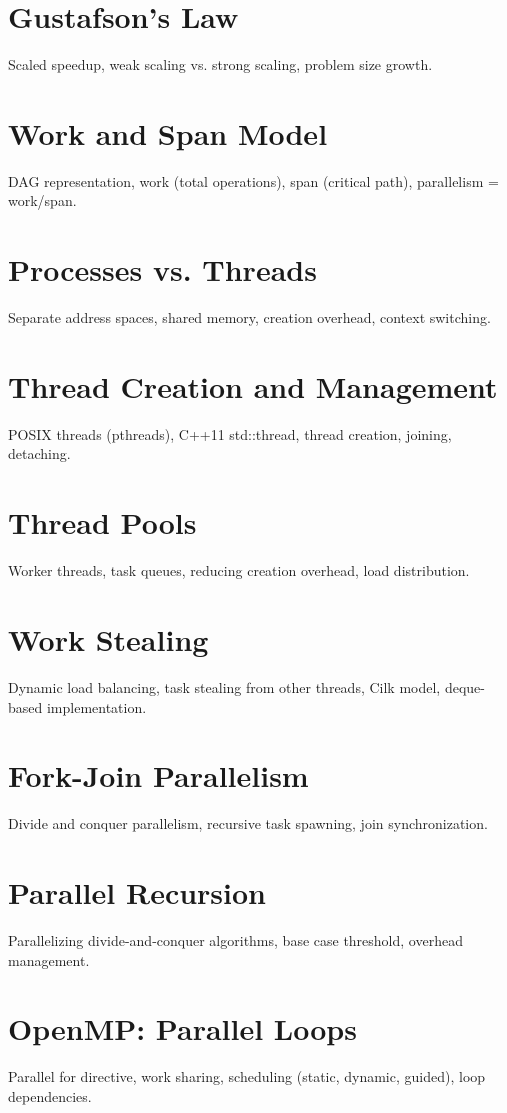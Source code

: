 \chapter{Gustafson's Law}
Scaled speedup, weak scaling vs. strong scaling, problem size growth.

\chapter{Work and Span Model}
DAG representation, work (total operations), span (critical path), parallelism = work/span.

\chapter{Processes vs. Threads}
Separate address spaces, shared memory, creation overhead, context switching.

\chapter{Thread Creation and Management}
POSIX threads (pthreads), C++11 std::thread, thread creation, joining, detaching.

\chapter{Thread Pools}
Worker threads, task queues, reducing creation overhead, load distribution.

\chapter{Work Stealing}
Dynamic load balancing, task stealing from other threads, Cilk model, deque-based implementation.

\chapter{Fork-Join Parallelism}
Divide and conquer parallelism, recursive task spawning, join synchronization.

\chapter{Parallel Recursion}
Parallelizing divide-and-conquer algorithms, base case threshold, overhead management.

\chapter{OpenMP: Parallel Loops}
Parallel for directive, work sharing, scheduling (static, dynamic, guided), loop dependencies.

